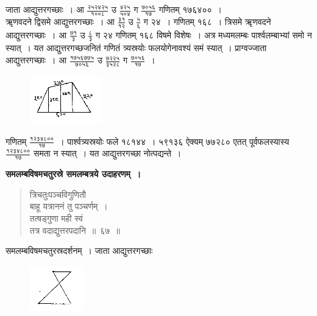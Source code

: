 \documentclass[11pt, openany]{book}
\begin{document}
 जाता आद्युत्तरगच्छाः~। आ $\frac{\mbox{२५२४२५}}{\mbox{१००८}}$ उ $\frac{\mbox{४२५}}{\mbox{५०४}}$ ग $\frac{\mbox{७०५६}}{\mbox{१७}}$
गणितम् १७६४००~। \\

\vspace{-2mm}
 ॠणवदने द्विसमे आद्युत्तरगच्छाः~। आ $\frac{\mbox{३१}}{\mbox{१२}}$ उ $\frac{\mbox{५}}{\mbox{६}}$ ग २४~। गणितम् १६८~। त्रिसमे ॠणवदने आद्युत्तरगच्छाः~। आ $\frac{\mbox{७१}}{\mbox{३}}$ उ $\frac{\mbox{८}}{\mbox{३}}$ ग २४ गणितम् १६८ विषमे विशेषः~। अत्र मध्यमलम्बः पार्श्वलम्बाभ्यां समो न स्यात्~। यत आद्युत्तरगच्छजनितं गणितं त्र्यस्रयोः फलयोगेनावश्यं समं स्यात्~। प्राग्वज्जाता आद्युत्तरगच्छाः~। आ $\frac{\mbox{१७५६७७५}}{\mbox{७०५६}}$ उ $\frac{\mbox{७२२५}}{\mbox{३५२८}}$ ग $\frac{\mbox{७०५६}}{\mbox{१७}}$~। 
 \vspace{-2mm}

\begin{figure}[h!]
    \centering
    \includegraphics[scale=0.85]{graphics/capture95.png}
\end{figure}
\vspace{-2mm}

गणितम् $\frac{\mbox{१२३४८००}}{\mbox{१७}}$~। पार्श्वत्र्यस्रयोः फले १८१४४~। ५९१३६ ऐक्यम् ७७२८० एतत् पूर्वफलस्यास्य $\frac{\mbox{१२३४८००}}{\mbox{१७}}$ समता न स्यात्~। यत आद्युत्तरगच्छा नोत्पद्यन्ते~। 
\newpage

\textbf{समलम्बविषमचतुरस्रे समलम्बत्रये उदाहरणम्~।}
\begin{quote}
    \bqt 
त्रिचतुःपञ्चविगुणितौ \\
बाहू यत्राननं तु पञ्चर्णम्~।\\
तत्षड्गुणा मही स्वं \\
तत्र वदाद्युत्तरपदानि~॥~६७~॥
\end{quote}

 समलम्बविषमचतुरस्रदर्शनम्~। जाता आद्युत्तरगच्छाः 
\vspace{-2mm}

\begin{figure}[h!]
    \centering
    \includegraphics[scale=0.85]{graphics/capture96.png}
\end{figure}
\vspace{-2mm}
\end{document}
